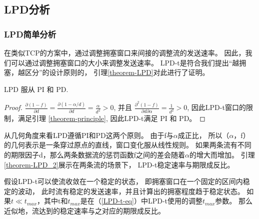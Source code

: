 \subsection{LPD分析}

\subsubsection{LPD简单分析}
在类似TCP的方案中，通过调整拥塞窗口来间接的调整流的发送速率。
因此，我们可以通过调整拥塞窗口的大小来调整发送速率。
LPD-t是符合我们提出“越拥塞，越区分”的设计原则的，
引理\ref{theorem-LPD}对此进行了证明。
 
\begin{lemma}\label{theorem-LPD}
LPD 服从 PI 和 PD. 
\end{lemma}
\begin{proof}
$\frac{\partial{(1-f)}}{\partial{d}}
=\frac{\partial{(1-\alpha/d)}}{\partial{d}}
=\frac{\alpha}{d^{2}}>0$, 
并且
$\frac{\partial^{2}{(1-f)}}{\partial{d}\partial{\alpha}}
=\frac{1}{d^{2}}>0$, 
因此LPD-t窗口的限制，满足引理 \ref{theorem-principle}, 
因此LPD-t满足 PI 和 PD。
\end{proof}

从几何角度来看LPD遵循PI和PD这两个原则。 
由于f与$\alpha$成正比，
所以（$\alpha$，f）的几何表示是一条穿过原点的直线，窗口变化服从线性规则。
如果两条流有不同的期限因子d，那么两条数据流的惩罚函数f之间的差会随着$\alpha$的增大而增加。
引理\ref{theorem-LPD_2}展示在两条流的场景下，
LPD-t稳定速率与期限成反比。


\begin{lemma}\label{theorem-LPD_2}
假设LPD-t可以使流收敛在一个稳定的状态，
即拥塞窗口在一个固定的区间内稳定的波动，
此时流有稳定的发送速率，并且计算出的拥塞程度趋于稳定状态。 
如果$t\ll t_{max}$，其中t和$t_{max}$是在（\ref{LPD-t-eq}）中LPD-t使用的调整$t_{max}$参数。
那么近似地，流达到的稳定速率与之对应的期限成反比。
\end{lemma}


